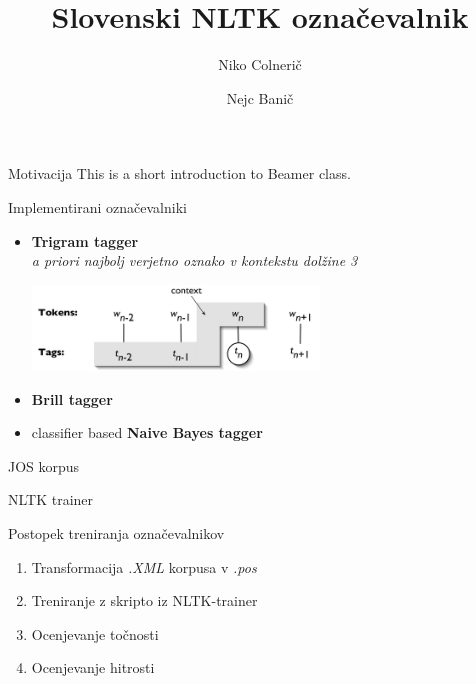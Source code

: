 \documentclass{beamer}
\title[Slovenski NLTK označevalnik]{Slovenski NLTK označevalnik}
\author{
	Niko Colnerič
	\and
	Nejc Banič}
\institute{ Fakulteta za Računalništvo in Informtiko\\
			Univerza v Ljubljani}
\begin{document}
\begin{frame}
\titlepage
\end{frame}

\begin{frame}{Motivacija}
This is a short introduction to Beamer class.
\end{frame}

\begin{frame}{Implementirani označevalniki}
\begin{itemize}
\item \textbf{Trigram tagger}\\
\textit{a priori najbolj verjetno oznako v kontekstu dolžine 3}
\begin{center}
\includegraphics[width=0.6\textwidth]{../paper/tag-context.png}
\end{center}

\item \textbf{Brill tagger}
\item classifier based \textbf{Naive Bayes tagger}
\end{itemize}
\end{frame}

\begin{frame}{JOS korpus}
\end{frame}

\begin{frame}{NLTK trainer}
\end{frame}

\begin{frame}{Postopek treniranja označevalnikov}
\begin{enumerate}
\item Transformacija \textit{.XML} korpusa v \textit{.pos}
\item Treniranje z skripto iz NLTK-trainer
\item Ocenjevanje točnosti
\item Ocenjevanje hitrosti
\end{enumerate}
\end{frame}
\end{document}
